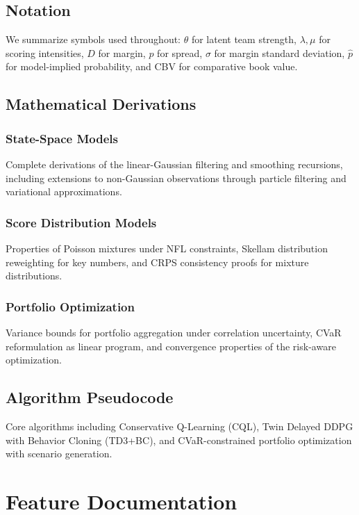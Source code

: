 \documentclass[12pt,letterpaper]{report}
\theoremstyle{definition}
\begin{document}
\section{Notation}
We summarize symbols used throughout: $\theta$ for latent team strength, $\lambda,\mu$ for scoring intensities, $D$ for margin, $p$ for spread, $\sigma$ for margin standard deviation, $\hat p$ for model-implied probability, and CBV for comparative book value.

\section{Mathematical Derivations}
\subsection{State-Space Models}
Complete derivations of the linear-Gaussian filtering and smoothing recursions, including extensions to non-Gaussian observations through particle filtering and variational approximations.

\subsection{Score Distribution Models}
Properties of Poisson mixtures under NFL constraints, Skellam distribution reweighting for key numbers, and CRPS consistency proofs for mixture distributions.

\subsection{Portfolio Optimization}
Variance bounds for portfolio aggregation under correlation uncertainty, CVaR reformulation as linear program, and convergence properties of the risk-aware optimization.

\section{Algorithm Pseudocode}
Core algorithms including Conservative Q-Learning (CQL), Twin Delayed DDPG with Behavior Cloning (TD3+BC), and CVaR-constrained portfolio optimization with scenario generation.

\chapter{Feature Documentation}
\end{document}

